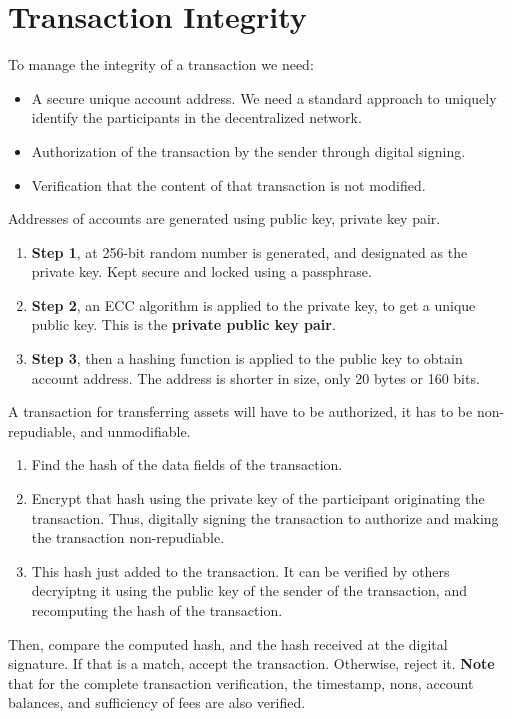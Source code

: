 \documentclass{article}
\begin{document}
\section{Transaction Integrity}
To manage the integrity of a transaction we need:
\begin{itemize}
    \item A secure unique account address. We need a standard approach to uniquely identify the participants in the decentralized network.
    \item Authorization of the transaction by the sender through digital signing.
    \item Verification that the content of that transaction is not modified.
\end{itemize} 
Addresses of accounts are generated using public key, private key pair. 
\begin{enumerate}
    \item \textbf{Step 1}, at 256-bit random number is generated, and designated as the private key. Kept secure and locked using a passphrase. 
    \item \textbf{Step 2}, an ECC algorithm is applied to the private key, to get a unique public key. This is the \textbf{private public key pair}.
    \item \textbf{Step 3}, then a hashing function is applied to the public key to obtain account address. The address is shorter in size, only 20 bytes or 160 bits.
\end{enumerate}
A transaction for transferring assets will have to be authorized, it has to be non-repudiable, and unmodifiable.
\begin{enumerate}
    \item Find the hash of the data fields of the transaction.
    \item Encrypt that hash using the private key of the participant originating the transaction. Thus, digitally signing the transaction to authorize and making the transaction non-repudiable.
    \item This hash just added to the transaction. It can be verified by others decryiptng it using the public key of the sender of the transaction, and recomputing the hash of the transaction. 
\end{enumerate}
Then, compare the computed hash, and the hash received at the digital signature. If that is a match, accept the transaction. Otherwise, reject it. \textbf{Note} that for the complete transaction verification, the timestamp, nons, account balances, and sufficiency of fees are also verified.
\end{document}
